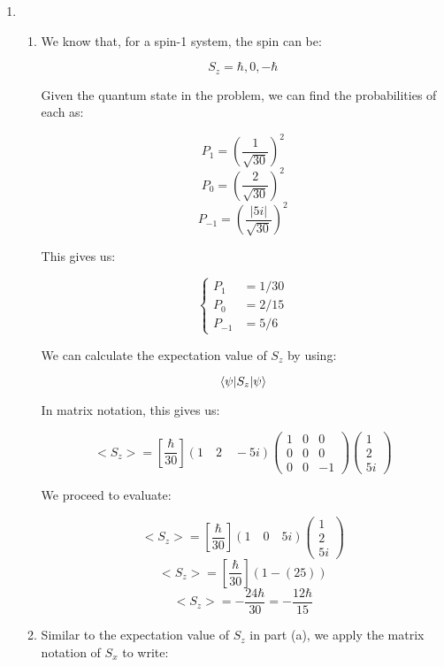 \begin{enumerate}

  \item

    \begin{enumerate}

      \item We know that, for a spin-1 system, the spin can be:

        $$\boxed{S_z=\hbar,0,-\hbar}$$

        Given the quantum state in the problem, we can find the probabilities of each as:

        $$P_1=\left( \frac{1}{\sqrt{30}} \right)^2$$
        $$P_0=\left( \frac{2}{\sqrt{30}} \right)^2$$
        $$P_{-1}=\left( \frac{|5i|}{\sqrt{30}} \right)^2$$

        This gives us:

        $$\boxed{\left\{\begin{array}{ll} P_1&= 1/30\\P_0&= 2/15\\P_{-1}&= 5/6\end{array}}$$

          We can calculate the expectation value of $S_z$ by using:

          $$\bra{\psi|S_z}\ket{\psi}$$

          In matrix notation, this gives us:

          $$<S_z>=\left[ \frac{\hbar}{30} \right](1\quad 2\quad -5i)\left( \begin{matrix} 1 & 0 & 0\\ 0 & 0 & 0\\ 0 & 0 & -1\end{matrix} \right)\left( \begin{matrix}1\\2\\5i\end{matrix} \right)$$

          We proceed to evaluate:

          $$<S_z>=\left[ \frac{\hbar}{30} \right](1\quad 0\quad 5i)\left( \begin{matrix}1\\2\\5i\end{matrix} \right)$$
          $$<S_z>=\left[ \frac{\hbar}{30} \right](1-(25))$$
          $$\boxed{<S_z>= -\frac{24\hbar}{30}=-\frac{12\hbar}{15}}$$

        \item Similar to the expectation value of $S_z$ in part (a), we apply the matrix notation of $S_x$ to write:


\end{enumerate}
\end{enumerate}
